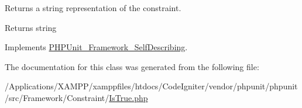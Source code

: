 Returns a string representation of the constraint.

\begin{DoxyReturn}{Returns}
string 
\end{DoxyReturn}


Implements \mbox{\hyperlink{interface_p_h_p_unit___framework___self_describing_a5558c5d549f41597377fa1ea8a1cefa3}{P\+H\+P\+Unit\+\_\+\+Framework\+\_\+\+Self\+Describing}}.



The documentation for this class was generated from the following file\+:\begin{DoxyCompactItemize}
\item 
/\+Applications/\+X\+A\+M\+P\+P/xamppfiles/htdocs/\+Code\+Igniter/vendor/phpunit/phpunit/src/\+Framework/\+Constraint/\mbox{\hyperlink{_is_true_8php}{Is\+True.\+php}}\end{DoxyCompactItemize}
